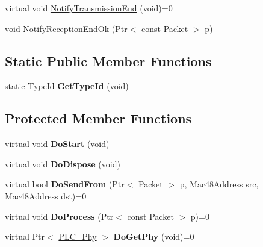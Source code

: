 \begin{DoxyCompactItemize}
\item 
virtual void \hyperlink{classns3_1_1PLC__Mac_ab082c6f7b324f3262c8e2da835deac00}{\-Notify\-Transmission\-End} (void)=0
\item 
void \hyperlink{classns3_1_1PLC__Mac_ab32011008a9fa556f61b7a0b31f5c082}{\-Notify\-Reception\-End\-Ok} (\-Ptr$<$ const \-Packet $>$ p)
\end{DoxyCompactItemize}
\subsection*{\-Static \-Public \-Member \-Functions}
\begin{DoxyCompactItemize}
\item 
\hypertarget{classns3_1_1PLC__Mac_a9cb375d159ef8f4f98ce5ccb71e0fc55}{static \-Type\-Id {\bfseries \-Get\-Type\-Id} (void)}\label{classns3_1_1PLC__Mac_a9cb375d159ef8f4f98ce5ccb71e0fc55}

\end{DoxyCompactItemize}
\subsection*{\-Protected \-Member \-Functions}
\begin{DoxyCompactItemize}
\item 
\hypertarget{classns3_1_1PLC__Mac_ade564ab18b54b5d839561c214f9c0304}{virtual void {\bfseries \-Do\-Start} (void)}\label{classns3_1_1PLC__Mac_ade564ab18b54b5d839561c214f9c0304}

\item 
\hypertarget{classns3_1_1PLC__Mac_aa7ee0e028804b882a8563c7a8784b3b3}{virtual void {\bfseries \-Do\-Dispose} (void)}\label{classns3_1_1PLC__Mac_aa7ee0e028804b882a8563c7a8784b3b3}

\item 
\hypertarget{classns3_1_1PLC__Mac_a059f2702bc117b2cb68732489b275962}{virtual bool {\bfseries \-Do\-Send\-From} (\-Ptr$<$ \-Packet $>$ p, \-Mac48\-Address src, \-Mac48\-Address dst)=0}\label{classns3_1_1PLC__Mac_a059f2702bc117b2cb68732489b275962}

\item 
\hypertarget{classns3_1_1PLC__Mac_a3a3165e888c70bf27e5c5f763a66b939}{virtual void {\bfseries \-Do\-Process} (\-Ptr$<$ const \-Packet $>$ p)=0}\label{classns3_1_1PLC__Mac_a3a3165e888c70bf27e5c5f763a66b939}

\item 
\hypertarget{classns3_1_1PLC__Mac_a6e820429841dc8e9d764d8b42b6fbc53}{virtual \-Ptr$<$ \hyperlink{classns3_1_1PLC__Phy}{\-P\-L\-C\-\_\-\-Phy} $>$ {\bfseries \-Do\-Get\-Phy} (void)=0}\label{classns3_1_1PLC__Mac_a6e820429841dc8e9d764d8b42b6fbc53}

\end{DoxyCompactItemize}
